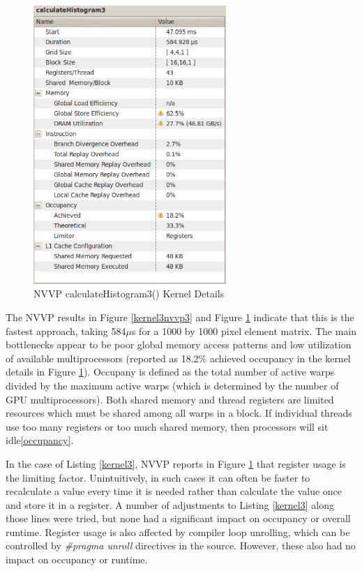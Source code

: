 \documentclass{article}
\begin{document}
\begin{figure}
\centering
\includegraphics[width=0.65\textwidth]{screenshots/nvvp/calculateHistogram3_screen4.png}
\caption{NVVP calculateHistogram3() Kernel Details}
\label{kernel3nvvp4}
\end{figure}

The NVVP results in Figure \ref{kernel3nvvp3} and Figure \ref{kernel3nvvp4} indicate that this is the fastest approach, taking 584$\mu$s for a 1000 by 1000 pixel element matrix. The main bottlenecks appear to be poor global memory access patterns and low utilization of available multiprocessors (reported as 18.2\% achieved occupancy in the kernel details in Figure \ref{kernel3nvvp4}). Occupany is defined as the total number of active warps divided by the maximum active warps (which is determined by the number of GPU multiprocessors). Both shared memory and thread registers are limited resources which must be shared among all warps in a block. If individual threads use too many registers or too much shared memory, then processors will sit idle\ref{occupancy}.

In the case of Listing \ref{kernel3}, NVVP reports in Figure \ref{kernel3nvvp4} that register usage is the limiting factor. Unintuitively, in such cases it can often be faster to recalculate a value every time it is needed rather than calculate the value once and store it in a register. A number of adjustments to Listing \ref{kernel3} along those lines were tried, but none had a significant impact on occupancy or overall runtime. Register usage is also affected by compiler loop unrolling, which can be controlled by \emph{#pragma unroll} directives in the source. However, these also had no impact on occupancy or runtime.
\end{document}
